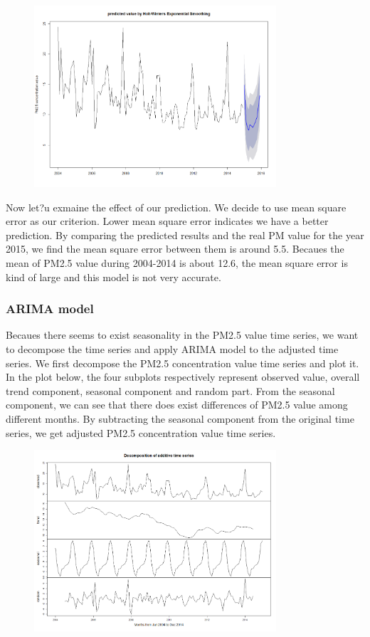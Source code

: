 \documentclass[10pt]{article}
\begin{document}
\begin{figure}[ht!]
\centering
\includegraphics[width = 90mm]{ts3.png}
\end{figure}

Now let?u exmaine the effect of our prediction. We decide to use mean square error as our criterion. Lower mean square error indicates we have a better prediction. By comparing the predicted results and the real PM value for the year 2015, we find the mean square error between them is around 5.5. Becaues the mean of PM2.5 value during 2004-2014 is about 12.6, the mean square error is kind of large and this model is not very accurate.

\subsubsection{ARIMA model}
Becaues there seems to exist seasonality in the PM2.5 value time series, we want to decompose the time series and apply ARIMA model to the adjusted time series. We first decompose the PM2.5 concentration value time series and plot it. In the plot below, the four subplots respectively represent observed value, overall trend component, seasonal component and random part. From the seasonal component, we can see that there does exist differences of PM2.5 value among different months. By subtracting the seasonal component from the original time series, we get adjusted PM2.5 concentration value time series.

\begin{figure}[ht!]
\centering
\includegraphics[width = 90mm]{ts4.png}
\end{figure}
\end{document}
